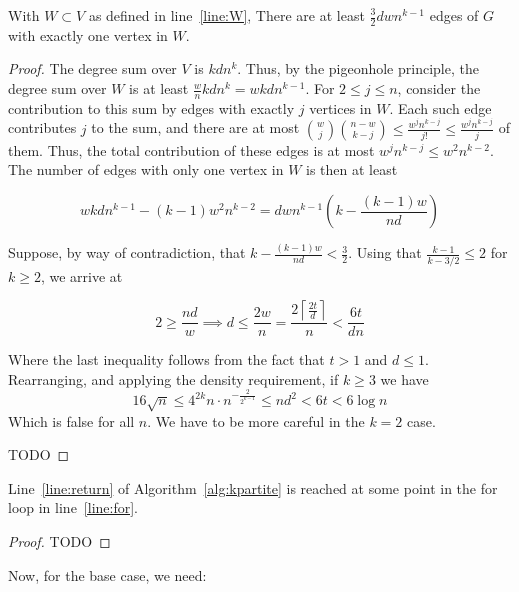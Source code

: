 \begin{lemma}
    With $W  \subset V$ as defined in line~\ref{line:W},
    There are at least $\frac{3}{2}dwn^{k-1}$ edges of $G$ with exactly one vertex in $W$.
    \begin{proof}
        The degree sum over $V$ is $kdn^{k}$.
        Thus, by the pigeonhole principle, the degree sum over $W$ is at least
        $\frac{w}{n}kdn^{k} = wkdn^{k-1}$.
        For $2 \leq j \leq n$, consider the contribution to this sum by edges with exactly $j$ vertices in $W$.
        Each such edge contributes $j$ to the sum, and there are at most
        $\binom{w}{j}\binom{n-w}{k-j} \leq \frac{w^j n^{k-j}}{j!} \leq \frac{w^j n^{k-j}}{j}$ of them.
        Thus, the total contribution of these edges is at most $w^j n^{k-j} \leq w^{2}n^{k-2}$.
        The number of edges with only one vertex in $W$ is then at least

        \[
            wkdn^{k-1} - (k-1)w^{2}n^{k-2} = dwn^{k-1} \left( k - \frac{(k-1)w}{nd}\right)
        \]

        Suppose, by way of contradiction,
        that $ k - \frac{(k-1)w}{nd} < \frac{3}{2}$.
        Using that $\frac{k-1}{k-3/2} \leq 2$
        for $k \geq 2$, we arrive at

        \[
            2 \geq  \frac{nd}{w} \implies d \leq \frac{2w}{n} = \frac{2 \left\lceil\frac{2t}{d} \right\rceil}{n}
            < \frac{6t}{dn}
        \]

        Where the last inequality follows from the fact that $t > 1$ and $d \leq 1$.
        Rearranging, and applying the density requirement, if $k \geq 3$ we have
        \[
            16 \sqrt {n} \leq 4^{2k} n \cdot n^{-\frac{2}{2^{k-1}}} \leq nd^2 < 6t < 6 \log n
        \]
        Which is false for all $n$.
        We have to be more careful in the $k = 2$ case.

        TODO %

    \end{proof}
\end{lemma}

\begin{lemma}
    Line~\ref{line:return} of Algorithm~\ref{alg:kpartite} is reached at some point in the for
    loop in line~\ref{line:for}.
    \begin{proof}
        TODO %
    \end{proof}
\end{lemma}

Now, for the base case, we need:


